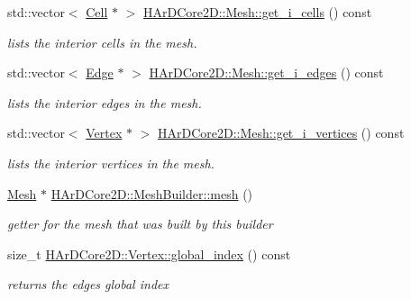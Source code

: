 \begin{DoxyCompactItemize}
std\+::vector$<$ \hyperlink{classHArDCore2D_1_1Cell}{Cell} $\ast$ $>$ \hyperlink{group__Mesh_gab962f4a1a88c7f4910a5e555e01064f3}{H\+Ar\+D\+Core2\+D\+::\+Mesh\+::get\+\_\+i\+\_\+cells} () const
\begin{DoxyCompactList}\small\item\em lists the interior cells in the mesh. \end{DoxyCompactList}\item 
\mbox{\label{group__Mesh_gabaaffe0b8981c9dab16ae34d63262638}} 
std\+::vector$<$ \hyperlink{classHArDCore2D_1_1Edge}{Edge} $\ast$ $>$ \hyperlink{group__Mesh_gabaaffe0b8981c9dab16ae34d63262638}{H\+Ar\+D\+Core2\+D\+::\+Mesh\+::get\+\_\+i\+\_\+edges} () const
\begin{DoxyCompactList}\small\item\em lists the interior edges in the mesh. \end{DoxyCompactList}\item 
\mbox{\label{group__Mesh_ga8f9f78dee50bb3c64136af58ee3468b4}} 
std\+::vector$<$ \hyperlink{classHArDCore2D_1_1Vertex}{Vertex} $\ast$ $>$ \hyperlink{group__Mesh_ga8f9f78dee50bb3c64136af58ee3468b4}{H\+Ar\+D\+Core2\+D\+::\+Mesh\+::get\+\_\+i\+\_\+vertices} () const
\begin{DoxyCompactList}\small\item\em lists the interior vertices in the mesh. \end{DoxyCompactList}\item 
\mbox{\label{group__Mesh_ga0cf325394142e077ffe05dd723cdeddc}} 
\hyperlink{classHArDCore2D_1_1Mesh}{Mesh} $\ast$ \hyperlink{group__Mesh_ga0cf325394142e077ffe05dd723cdeddc}{H\+Ar\+D\+Core2\+D\+::\+Mesh\+Builder\+::mesh} ()
\begin{DoxyCompactList}\small\item\em getter for the mesh that was built by this builder \end{DoxyCompactList}\item 
\mbox{\label{group__Mesh_gad19d3dca11de693ac4a454b2263eb179}} 
size\+\_\+t \hyperlink{group__Mesh_gad19d3dca11de693ac4a454b2263eb179}{H\+Ar\+D\+Core2\+D\+::\+Vertex\+::global\+\_\+index} () const
\begin{DoxyCompactList}\small\item\em returns the edges global index \end{DoxyCompactList}\item 

\end{DoxyCompactItemize}

